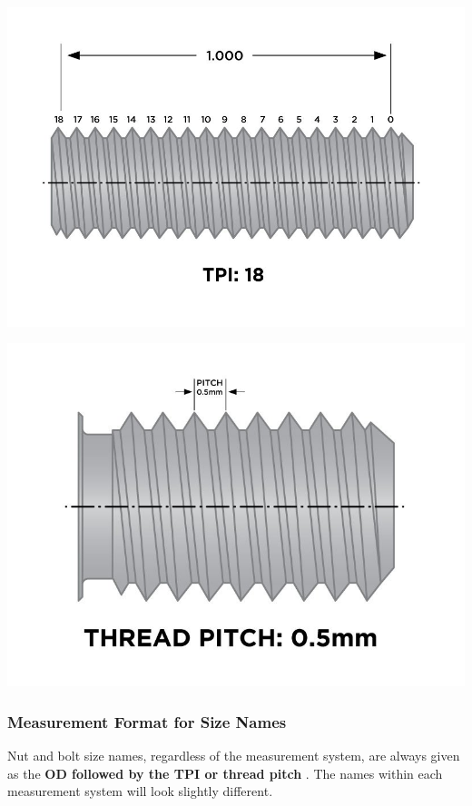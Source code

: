 \documentclass[12pt, a4paper]{article}
\begin{document}
		\includegraphics{Introduction to Nut and Bolt Sizes_files/62ffe00403d64741542980.jpg}
		
		\hypertarget{i5uow1}{}
		\includegraphics{Introduction to Nut and Bolt Sizes_files/62ffe01b5939b908779409.jpg}
		
		\hypertarget{iazchh}{%
			\subsubsection{Measurement Format for Size Names}\label{iazchh}}
		
		\hypertarget{ialm3q}{}
		Nut and bolt size names, regardless of the measurement system, are
		always given as the \textbf{OD followed by the TPI or thread pitch} .
		The names within each measurement system will look slightly different.
		
\end{document}
